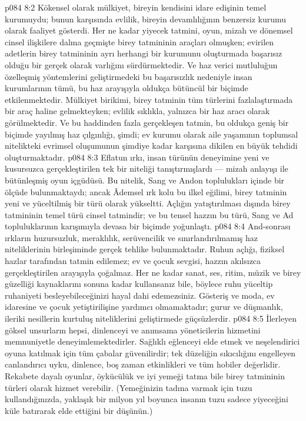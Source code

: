 \vs p084 8:2 Kökensel olarak mülkiyet, bireyin kendisini idare edişinin temel kurumuydu; bunun karşısında evlilik, bireyin devamlılığının benzersiz kurumu olarak faaliyet gösterdi. Her ne kadar yiyecek tatmini, oyun, mizah ve dönemsel cinsel ilişkilere dalma geçmişte birey tatmininin araçları olmuşken; evirilen adetlerin birey tatmininin ayrı herhangi bir kurumunu oluşturmada başarısız olduğu bir gerçek olarak varlığını sürdürmektedir. Ve haz verici mutluluğun özelleşmiş yöntemlerini geliştirmedeki bu başarısızlık nedeniyle insan kurumlarının tümü, bu haz arayışıyla oldukça bütüncül bir biçimde etkilenmektedir. Mülkiyet birikimi, birey tatminin tüm türlerini fazlalaştırmada bir araç haline gelmekteyken; evlilik sıklıkla, yalnızca bir haz aracı olarak görülmektedir. Ve bu haddinden fazla gerçekleşen tatmin, bu oldukça geniş bir biçimde yayılmış haz çılgınlığı, şimdi; ev kurumu olarak aile yaşamının toplumsal nitelikteki evrimsel oluşumunun şimdiye kadar karşısına dikilen en büyük tehdidi oluşturmaktadır.
\vs p084 8:3 Eflatun ırkı, insan türünün deneyimine yeni ve kusursuzca gerçekleştirilen tek bir niteliği tanıştırmışlardı --- mizah anlayışı ile bütünleşmiş oyun içgüdüsü. Bu nitelik, Sang ve Andon toplulukları içinde bir ölçüde bulunmaktaydı; ancak Âdemsel ırk kolu bu ilkel eğilimi, birey tatminin yeni ve yüceltilmiş bir türü olarak  yükseltti. Açlığın yatıştırılması dışında birey tatmininin temel türü cinsel tatmindir; ve bu tensel hazzın bu türü, Sang ve Ad topluluklarının karışımıyla devasa bir biçimde yoğunlaştı.
\vs p084 8:4 And\hyp{}sonrası ırkların huzursuzluk, meraklılık, serüvencilik ve sınırlandırılmamış haz niteliklerinin birleşiminde gerçek tehlike bulunmaktadır. Ruhun açlığı, fiziksel hazlar tarafından tatmin edilemez; ev ve çocuk sevgisi, hazzın akılsızca gerçekleştirilen arayışıyla çoğalmaz. Her ne kadar sanat, ses, ritim, müzik ve birey güzelliği kaynaklarını sonuna kadar kullansanız bile, böylece ruhu yüceltip ruhaniyeti besleyebileceğinizi hayal dahi edemezsiniz. Gösteriş ve moda, ev idaresine ve çocuk yetiştirilişine yardımcı olmamaktadır; gurur ve düşmanlık, ileriki nesillerin kurtuluş niteliklerini geliştirmede güçsüzlerdir.
\vs p084 8:5 İlerleyen göksel unsurların hepsi, dinlenceyi ve anımsama yöneticilerin hizmetini memnuniyetle deneyimlemektedirler. Sağlıklı eğlenceyi elde etmek ve neşelendirici oyuna katılmak için tüm çabalar güvenilirdir; tek düzeliğin sıkıcılığını engelleyen canlandırıcı uyku, dinlence, boş zaman etkinlikleri ve tüm hobiler değerlidir. Rekabete dayalı oyunlar, öykücülük ve iyi yemeği tatma bile birey tatmininin türleri olarak hizmet verebilir. (Yemeğinizin tadına varmak için tuzu kullandığınızda, yaklaşık bir milyon yıl boyunca insanın tuzu sadece yiyeceğini küle batırarak elde ettiğini bir düşünün.)
